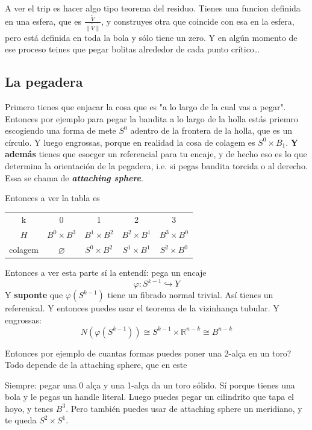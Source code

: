A ver el trip es hacer algo tipo teorema del residuo. Tienes una funcion definida en una esfera, que es \(\frac{\tilde{V}}{\|\tilde{V}\|}\), y construyes otra que coincide con esa en la esfera, pero está definida en toda la bola y sólo tiene un zero.  Y en algún momento de ese proceso teines que pegar bolitas alrededor de cada punto crítico…

\subsection{La pegadera}

Primero tienes que enjacar la cosa que es "a lo largo de la cual vas a pegar". Entonces por ejemplo para pegar la bandita a lo largo de la holla estás priemro escogiendo una forma de mete \(S^0\) adentro de la frontera de la holla, que es un círculo. Y luego engrossas, porque en realidad la cosa de colagem es \(S^0 \times B_1\). \textbf{Y además} tienes que esocger un referencial para tu encaje, y de hecho eso es lo que determina la orientación de la pegadera, i.e. si pegas bandita torcida o al derecho. Essa se chama de \textit{\textbf{attaching sphere}}.

Entonces a ver la tabla es

\begin{table}[H]
	\centering
	\begin{tabular}{c|c|c|c|c}
		k & 0 & 1 & 2 & 3\\
		\(H\) & \(B^0 \times B^3\) & \(B^1 \times B^2\) & \(B^2 \times B^1\) &\(B^3 \times B^0\)\\
		colagem & \(\varnothing\)&\(S^0 \times B^2\)&\(S^1 \times B^1\)& \(S^2 \times B^0\)
	\end{tabular}
\end{table}
Entonces a ver esta parte sí la entendí: pega un encaje
\[\varphi: S^{k-1}\hookrightarrow Y\]
Y \textbf{suponte} que \(\varphi(S^{k-1})\) tiene un fibrado normal trivial. Así tienes un referenical. Y entonces puedes usar el teorema de la vizinhança tubular. Y engrossas:
\[N (\varphi(S^{k-1})) \cong S^{k-1} \times \mathbb{R}^{n-k}\cong B^{n-k}\]

Entonces por ejemplo de cuantas formas puedes poner una 2-alça en un toro? Todo depende de la attaching sphere, que en este 

Siempre: pegar una 0 alça y una 1-alça da un toro sólido. Sí porque tienes una bola y le pegas un handle literal. Luego puedes pegar un cilindrito que tapa el hoyo, y tenes \(B^3\). Pero también puedes usar de attaching sphere un meridiano, y te queda \(S^2\times S^1\).

